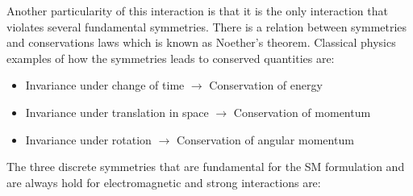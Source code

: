 Another particularity of this interaction is that it is the only interaction that violates several fundamental symmetries. 
There is a relation between symmetries and conservations laws which is known as Noether's theorem. Classical physics
examples of how the symmetries leads to conserved quantities are:
\begin{itemize}
	\item Invariance under change of time $\rightarrow$ Conservation of energy
	\item Invariance under translation in space $\rightarrow$ Conservation of momentum
	\item Invariance under rotation $\rightarrow$ Conservation of angular momentum
\end{itemize}

The three discrete symmetries that are fundamental for the SM formulation and are always hold for electromagnetic and strong interactions are:

